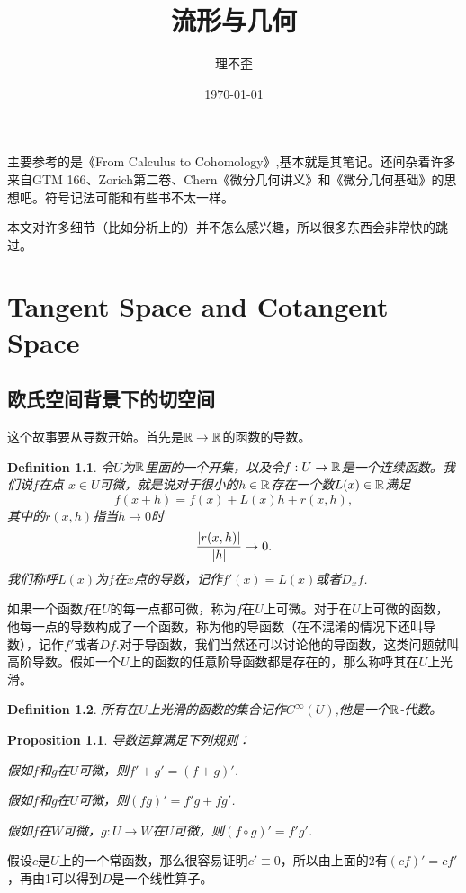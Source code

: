\documentclass[8pt]{book}
\theoremstyle{plain}%
\newtheorem{pro}{Proposition}[section]%
\newtheorem{defi}{Definition}[section]%
\begin{document}
\title{流形与几何}
\author{理不歪}
\date{\today}
\maketitle %
\clearpage
主要参考的是《From Calculus to Cohomology》,基本就是其笔记。还间杂着许多来自GTM 166、Zorich第二卷、Chern《微分几何讲义》和《微分几何基础》的思想吧。符号记法可能和有些书不太一样。

本文对许多细节（比如分析上的）并不怎么感兴趣，所以很多东西会非常快的跳过。
\clearpage
\chapter{Tangent Space and Cotangent Space}
\section{欧氏空间背景下的切空间}
这个故事要从导数开始。首先是$\mathbb{R}\to \mathbb{R}$的函数的导数。
\begin{defi}
	令$U$为$\mathbb{R}$里面的一个开集，以及令$f:U\rightarrow \mathbb{R}$是一个连续函数。我们说$f$在点 $x \in U$可微，就是说对于很小的$h \in \mathbb{R}$存在一个数$L(x)\in \mathbb{R}$满足
	\begin{equation}
		f(x+h)=f(x)+L(x)h+r(x,h),
	\end{equation}
	其中的$r(x,h)$指当$h\to 0$时
	\begin{equation}
		\frac{\arrowvert r(x,h) \arrowvert}{\arrowvert h \arrowvert} \to 0.
	\end{equation}
	我们称呼$L(x)$为$f$在$x$点的导数，记作$f'(x)=L(x)$或者$D_xf$.
\end{defi}
如果一个函数$f$在$U$的每一点都可微，称为$f$在$U$上可微。对于在$U$上可微的函数，他每一点的导数构成了一个函数，称为他的导函数（在不混淆的情况下还叫导数），记作$f'$或者$Df$.对于导函数，我们当然还可以讨论他的导函数，这类问题就叫高阶导数。假如一个$U$上的函数的任意阶导函数都是存在的，那么称呼其在$U$上光滑。
\begin{defi}
	所有在$U$上光滑的函数的集合记作$C^\infty(U)$,他是一个$\mathbb{R}$-代数。
\end{defi}
\begin{pro}
	导数运算满足下列规则：
	
	假如$f$和$g$在$U$可微，则$f'+g'=(f+g)'$.
	
	假如$f$和$g$在$U$可微，则$(fg)'=f'g+fg'$.
	
	假如$f$在$W$可微，$g:U\to W$在$U$可微，则$(f\circ g)'=f'g'$.
\end{pro}
假设$c$是$U$上的一个常函数，那么很容易证明$c'\equiv 0$，所以由上面的2有$(cf)'=cf'$，再由1可以得到$D$是一个线性算子。
\end{document}
